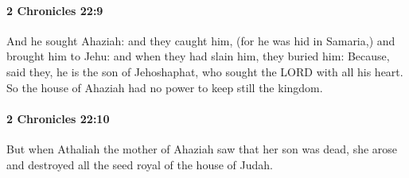 		\paragraph{2 Chronicles 22:9} %
			\label{2CHRONICLES-22-9}

			And he sought Ahaziah: and they caught him, (for he was hid in Samaria,) and brought him to Jehu: and when they had slain him, they buried him: Because, said they, he is the son of Jehoshaphat, who sought the LORD with all his heart. So the house of Ahaziah had no power to keep still the kingdom.


		\paragraph{2 Chronicles 22:10} %
			\label{2CHRONICLES-22-10}

			But when Athaliah the mother of Ahaziah saw that her son was dead, she arose and destroyed all the seed royal of the house of Judah.

